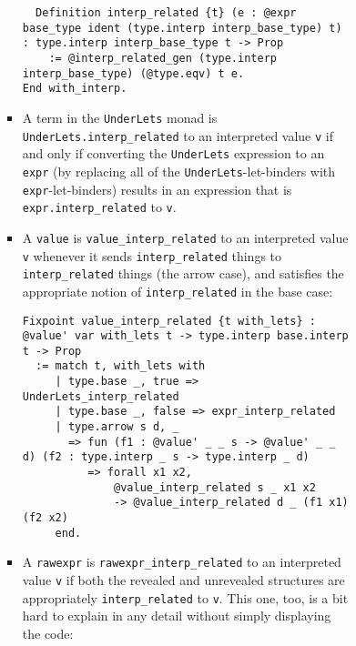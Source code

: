 \documentclass[
]{article}
\begin{document}
\begin{itemize}
\begin{itemize}
\begin{itemize}
\begin{itemize}
\begin{itemize}
\begin{itemize}
\begin{verbatim}
  Definition interp_related {t} (e : @expr base_type ident (type.interp interp_base_type) t) : type.interp interp_base_type t -> Prop
    := @interp_related_gen (type.interp interp_base_type) (@type.eqv) t e.
End with_interp.
\end{verbatim}
          \item
            A term in the \texttt{UnderLets} monad is
            \texttt{UnderLets.interp\_related} to an interpreted value
            \texttt{v} if and only if converting the \texttt{UnderLets}
            expression to an \texttt{expr} (by replacing all of the
            \texttt{UnderLets}-let-binders with
            \texttt{expr}-let-binders) results in an expression that is
            \texttt{expr.interp\_related} to \texttt{v}.
          \item
            A \texttt{value} is \texttt{value\_interp\_related} to an
            interpreted value \texttt{v} whenever it sends
            \texttt{interp\_related} things to \texttt{interp\_related}
            things (the arrow case), and satisfies the appropriate
            notion of \texttt{interp\_related} in the base case:

\begin{verbatim}
Fixpoint value_interp_related {t with_lets} : @value' var with_lets t -> type.interp base.interp t -> Prop
  := match t, with_lets with
     | type.base _, true => UnderLets_interp_related
     | type.base _, false => expr_interp_related
     | type.arrow s d, _
       => fun (f1 : @value' _ _ s -> @value' _ _ d) (f2 : type.interp _ s -> type.interp _ d)
          => forall x1 x2,
              @value_interp_related s _ x1 x2
              -> @value_interp_related d _ (f1 x1) (f2 x2)
     end.
\end{verbatim}
          \item
            A \texttt{rawexpr} is \texttt{rawexpr\_interp\_related} to
            an interpreted value \texttt{v} if both the revealed and
            unrevealed structures are appropriately
            \texttt{interp\_related} to \texttt{v}. This one, too, is a
            bit hard to explain in any detail without simply displaying
            the code:


\end{itemize}
\end{itemize}
\end{itemize}
\end{itemize}
\end{itemize}
\end{itemize}
\end{document}
